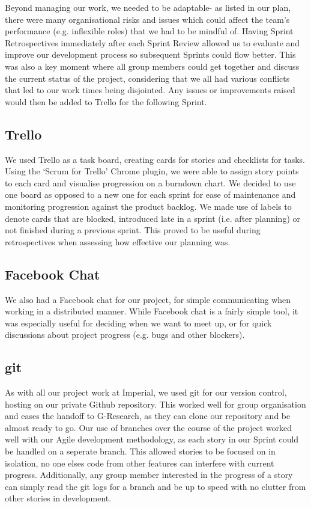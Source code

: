 Beyond managing our work, we needed to be adaptable- as listed in our plan, there were many organisational risks and issues which could affect the team's performance (e.g. inflexible roles) that we had to be mindful of. Having Sprint Retrospectives immediately after each Sprint Review allowed us to evaluate and improve our development process so subsequent Sprints could flow better. This was also a key moment where all group members could get together and discuss the current status of the project, considering that we all had various conflicts that led to our work times being disjointed. Any issues or improvements raised would then be added to Trello for the following Sprint.

\subsection{Trello}
We used Trello as a task board, creating cards for stories and checklists for tasks. Using the `Scrum for Trello' Chrome plugin, we were able to assign story points to each card and visualise progression on a burndown chart. We decided to use one board as opposed to a new one for each sprint for ease of maintenance and monitoring progression against the product backlog. We made use of labels to denote cards that are blocked, introduced late in a sprint (i.e. after planning) or not finished during a previous sprint. This proved to be useful during retrospectives when assessing how effective our planning was.

\subsection{Facebook Chat}
We also had a Facebook chat for our project, for simple communicating when working in a distributed manner. While Facebook chat is a fairly simple tool, it was especially useful for deciding when we want to meet up, or for quick discussions about project progress (e.g. bugs and other blockers).

\subsection{git}
As with all our project work at Imperial, we used git for our version control, hosting on our private Github repository. This worked well for group organisation and eases the handoff to G-Research, as they can clone our repository and be almost ready to go. Our use of branches over the course of the project worked well with our Agile development methodology, as each story in our Sprint could be handled on a seperate branch. This allowed stories to be focused on in isolation, no one elses code from other features can interfere with current progress. Additionally, any group member interested in the progress of a story can simply read the git logs for a branch and be up to speed with no clutter from other stories in development.

